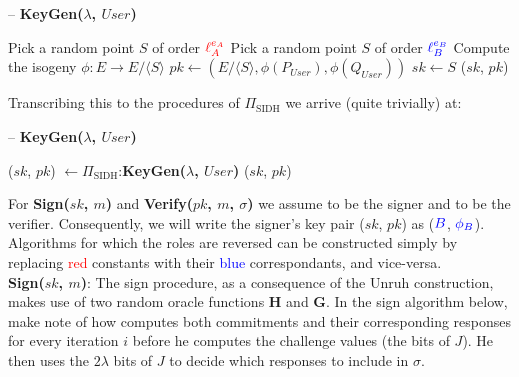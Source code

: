 \begin{algorithm}
\caption{-- \textbf{KeyGen($\lambda$, $User$)}}\label{alg:keygensig}
\begin{algorithmic}[1]
	\State Pick a random point $S$ of order $\textcolor{red}{\ell_{A}^{e_A}}$
\EndIf
{}
	\State Pick a random point $S$ of order $\textcolor{blue}{\ell_{B}^{e_B}}$
\EndIf
\State Compute the isogeny $\phi: E \rightarrow E/\langle S \rangle$
\State $pk \gets (E/\langle S \rangle, \phi(P_{User}), \phi(Q_{User}))$
\State $sk \gets S$
\State \Return ($sk$, $pk$)
\end{algorithmic}
\end{algorithm}

\noindent
Transcribing this to the procedures of $\Pi_{\text{SIDH}}$ we arrive (quite trivially) at:\\

\begin{algorithm}
\caption{-- \textbf{KeyGen($\lambda$, $User$)}}\label{euclid}
\begin{algorithmic}[1]
\State ($sk$, $pk$) $\gets \Pi_{\text{SIDH}}$:\textbf{KeyGen($\lambda$, $User$)}
\State \Return ($sk$, $pk$)
\end{algorithmic}
\end{algorithm}

For \textbf{Sign($sk$, $m$)} and \textbf{Verify($pk$, $m$, $\sigma$)} we assume \bob to be the signer and \alice to be the verifier. Consequently, we will write the signer's key pair ($sk$, $pk$) as ($\textcolor{blue}{B}$, $\textcolor{blue}{\phi_B}$). Algorithms for which the roles are reversed can be constructed simply by replacing \textcolor{red}{red} constants with their \textcolor{blue}{blue} correspondants, and vice-versa.\\  

\noindent
\textbf{Sign($sk$, $m$)}: The sign procedure, as a consequence of the Unruh construction, makes use of two random oracle functions \textbf{H} and \textbf{G}. In the sign algorithm below, make note of how \bob computes both commitments and their corresponding responses for every iteration $i$ before he computes the challenge values (the bits of $J$). He then uses the $2\lambda$ bits of $J$ to decide which responses to include in $\sigma$.\\

